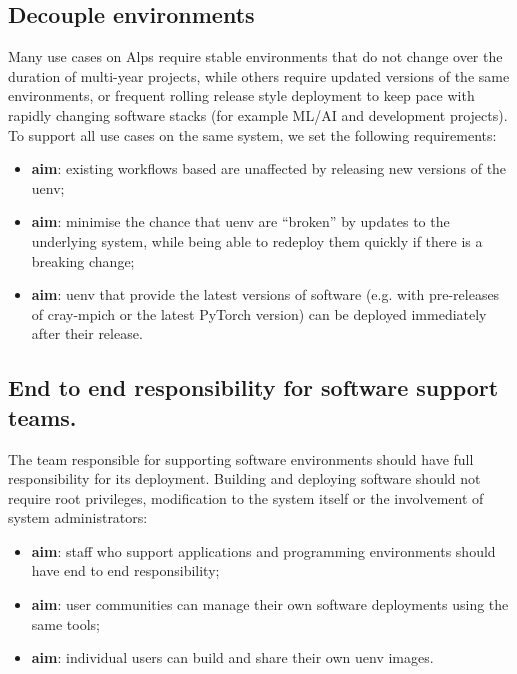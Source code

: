 \subsection{Decouple environments}

Many use cases on Alps require stable environments that do not change over the duration of multi-year projects,
while others require updated versions of the same environments, or frequent rolling release style deployment to keep pace with rapidly changing software stacks (for example ML/AI and development projects).
To support all use cases on the same system, we set the following requirements:
\begin{itemize}
    \item \textbf{aim}: existing workflows based are unaffected by releasing new versions of the uenv;
    \item \textbf{aim}: minimise the chance that uenv are ``broken'' by updates to the underlying system, while being able to redeploy them quickly if there is a breaking change;
    \item \textbf{aim}: uenv that provide the latest versions of software (e.g. with pre-releases of cray-mpich or the latest PyTorch version) can be deployed immediately after their release.
\end{itemize}

\subsection{End to end responsibility for software support teams.}
\label{sec:objective-e2e}

The team responsible for supporting software environments should have full responsibility for its deployment.
Building and deploying software should not require root privileges, modification to the system itself or the involvement of system administrators:
\begin{itemize}
    \item \textbf{aim}: staff who support applications and programming environments should have end to end responsibility;
    \item \textbf{aim}: user communities can manage their own software deployments using the same tools;
    \item \textbf{aim}: individual users can build and share their own uenv images.
\end{itemize}

